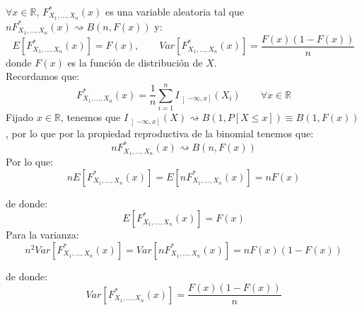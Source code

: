 \begin{ejercicio}
    $\forall x\in \mathbb{R}$, $F_{X_1, \ldots, X_n}^\ast(x)$ es una variable aleatoria tal que \newline $nF_{X_1, \ldots, X_n}^\ast(x) \rightsquigarrow B(n,F(x))$ y:
    \begin{equation*}
        E[F_{X_1, \ldots, X_n}^\ast (x)] = F(x), \qquad Var[F_{X_1, \ldots, X_n}^\ast (x)] = \dfrac{F(x)(1-F(x))}{n}
    \end{equation*}
    donde $F(x)$ es la función de distribución de $X$.\\

    \noindent
    Recordamos que:
    \begin{equation*}
    F_{X_1, \ldots, X_n}^\ast (x) = \dfrac{1}{n}\sum_{i=1}^{n}I_{\left]-\infty,x\right]}(X_i) \qquad \forall x\in \mathbb{R}
    \end{equation*}
Fijado $x\in \mathbb{R}$, tenemos que $I_{\left]-\infty,x\right]}(X)\rightsquigarrow B(1,P[X\leq x]) \equiv B(1,F(x))$, por lo que por la propiedad reproductiva de la binomial tenemos que:
    \begin{equation*}
        nF_{X_1, \ldots, X_n}^\ast (x) \rightsquigarrow B(n,F(x))
    \end{equation*}
    Por lo que:
    \begin{equation*}
        nE[F_{X_1, \ldots, X_n}^\ast (x)] = E[nF_{X_1, \ldots, X_n}^\ast (x)] = nF(x)
    \end{equation*}

    de donde:
    \begin{equation*}
        E[F_{X_1, \ldots, X_n}^\ast (x)] = F(x)
    \end{equation*}
    Para la varianza:
    \begin{equation*}
        n^2Var[F_{X_1, \ldots, X_n}^\ast (x)] = Var[nF_{X_1, \ldots, X_n}^\ast (x)] = nF(x)(1-F(x))
    \end{equation*}
    
    de donde:
    \begin{equation*}
        Var[F_{X_1, \ldots, X_n}^\ast (x)] = \dfrac{F(x)(1-F(x))}{n}
    \end{equation*}
\end{ejercicio}

